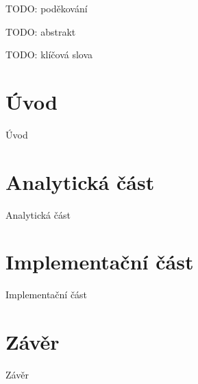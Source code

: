 \documentclass[11pt,draft,oneside]{fithesis2}
\begin{document}
\FrontMatter
\ThesisTitlePage

\begin{ThesisDeclaration}
  \DeclarationText
  \AdvisorName
\end{ThesisDeclaration}

\begin{ThesisThanks}
TODO: poděkování
\end{ThesisThanks}

\begin{ThesisAbstract}
TODO: abstrakt
\end{ThesisAbstract}

\begin{ThesisKeyWords}
TODO: klíčová slova
\end{ThesisKeyWords}

\MainMatter

\tableofcontents


\chapter{Úvod}
Úvod

\chapter{Analytická část}
Analytická část

\chapter{Implementační část}
Implementační část

\chapter{Závěr}
Závěr


\end{document}
